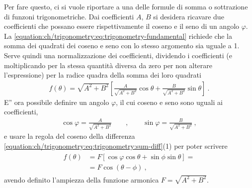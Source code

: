 \documentclass[letterpaper,10pt,italian]{jupyterBook}
\begin{document}
\sphinxAtStartPar
Per fare questo, ci si vuole riportare a una delle formule di somma o sottrazione di funzoni trigonometriche. Dai coefficienti \(A\), \(B\) si desidera ricavare due coefficienti che possano essere rispettivamente il coseno e il seno di un angolo \(\varphi\). La {\hyperref[\detokenize{ch/trigonometry:math-hs-trigonometry-fundamental}]{}} \eqref{equation:ch/trigonometry:eq:trigonometry-fundamental} richiede che la somma dei quadrati dei coseno e seno con lo stesso argomento sia uguale a 1. Serve quindi una normalizzazione dei coefficienti, dividendo i coefficienti (e moltiplicando per la stessa quantità diversa da zero per non alterare l’espressione) per la radice quadra della somma dei loro quadrati
\begin{equation*}
\begin{split}f(\theta) = \sqrt{A^2+B^2} \left[ \frac{A}{\sqrt{A^2+B^2}} \cos \theta + \frac{B}{\sqrt{A^2+B^2}} \sin \theta \right] \ .\end{split}
\end{equation*}
\sphinxAtStartPar
E” ora possibile definire un angolo \(\varphi\), il cui coseno e seno sono uguali ai coefficienti,
\begin{equation*}
\begin{split}\cos \varphi = \frac{A}{\sqrt{A^2+B^2}}  \qquad , \qquad \sin \varphi = \frac{B}{\sqrt{A^2+B^2}} \ , \end{split}
\end{equation*}
\sphinxAtStartPar
e usare la regola del coseno della differenza \eqref{equation:ch/trigonometry:eq:trigonometry:sum-diff}(1) per poter scrivere
\begin{equation*}
\begin{split}\begin{aligned}
  f(\theta) 
  & = F \left[ \cos \varphi \cos \theta + \sin \phi \sin \theta \right] = \\ 
  & = F \cos ( \theta - \phi ) \ ,
\end{aligned}\end{split}
\end{equation*}
\sphinxAtStartPar
avendo definito l’ampiezza della funzione armonica \(F = \sqrt{A^2 + B^2}\).


\subsection{}
\label{\detokenize{ch/trigonometry:id1}}
\sphinxstepscope
\end{document}
